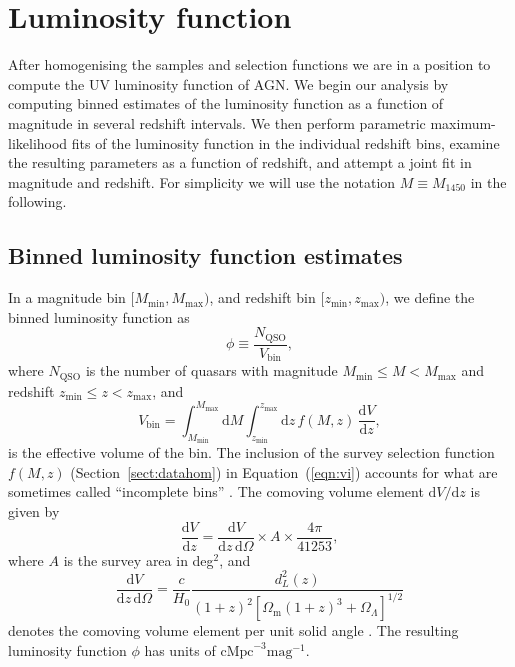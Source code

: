 \documentclass[fleqn,usenatbib]{mnras}
\begin{document}
\section{Luminosity function}
\label{sec:lf}

After homogenising the samples and selection functions we are in a
position to compute the UV luminosity function of AGN. We begin our
analysis by computing binned estimates of the luminosity function as a
function of magnitude in several redshift intervals.  We then perform
parametric maximum-likelihood fits of the luminosity function in the
individual redshift bins, examine the resulting parameters as a
function of redshift, and attempt a joint fit in magnitude and
redshift.  For simplicity we will use the notation $M\equiv M_{1450}$
in the following.

\subsection{Binned luminosity function estimates}
\label{sec:binnedlf}

In a magnitude bin $[M_\mathrm{min}, M_\mathrm{max})$, and redshift
  bin $[z_\mathrm{min}, z_\mathrm{max})$, we define the binned luminosity
function as \citep{2000MNRAS.311..433P}
\begin{equation}
  \phi \equiv \frac{N_\mathrm{QSO}}{V_\mathrm{bin}},
\end{equation}
where $N_\mathrm{QSO}$ is the number of quasars with magnitude
$M_\mathrm{min}\leq M<M_\mathrm{max}$ and redshift
$z_\mathrm{min}\leq z<z_\mathrm{max}$, and
\begin{equation}
  V_\mathrm{bin} = \int_{M_\mathrm{min}}^{M_\mathrm{max}}\mathrm{d}M
  \int_{z_\mathrm{min}}^{z_\mathrm{max}}\mathrm{d}z\, f(M, z)\,\frac{\mathrm{d}V}{\mathrm{d}z},
  \label{eqn:vi}
\end{equation}
is the effective volume of the bin. The inclusion of the survey selection function
$f(M,z)$ (Section~\ref{sect:datahom}) in Equation~(\ref{eqn:vi}) accounts for
what are sometimes called ``incomplete bins''
\citep{2006AJ....131.2766R}.  The comoving volume element $\mathrm{d}V/\mathrm{d}z$ is
given by
\begin{equation}
  \frac{\mathrm{d}V}{\mathrm{d}z}=\frac{\mathrm{d}V}{\mathrm{d}z\,\mathrm{d}\Omega}\times A\times\frac{4\pi}{41253},
\end{equation}
where $A$ is the survey area in deg$^2$, and 
\begin{equation}
  \frac{\mathrm{d}V}{\mathrm{d}z\,\mathrm{d}\Omega}=\frac{c}{H_0}\frac{d_L^2\left(z\right)}
       {\left(1+z\right)^2\left[\Omega_\mathrm{m}\left(1+z\right)^3+\Omega_\Lambda\right]^{1/2}}
  \label{eqn:dvdzdo}
\end{equation}
denotes the comoving volume element per unit solid angle
\citep{1999astro.ph..5116H}. The resulting luminosity function $\phi$ has units of
$\mathrm{cMpc}^{-3}\mathrm{mag}^{-1}$. 
\end{document}
